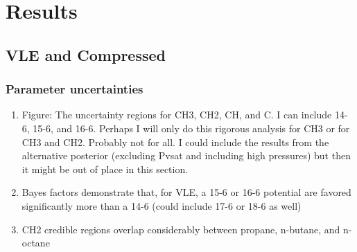 \documentclass[journal=jctc,manuscript=article]{achemso}
\begin{document}
\section{Results} \label{Results}

\subsection{VLE and Compressed}

\subsubsection{Parameter uncertainties}

\begin{enumerate}
	\item Figure: The uncertainty regions for CH3, CH2, CH, and C. I can include 14-6, 15-6, and 16-6. Perhaps I will only do this rigorous analysis for CH3 or for CH3 and CH2. Probably not for all. 
I could include the results from the alternative posterior (excluding Pvsat and including high pressures) but then it might be out of place in this section.
	\item Bayes factors demonstrate that, for VLE, a 15-6 or 16-6 potential are favored significantly more than a 14-6 (could include 17-6 or 18-6 as well)
	\item CH2 credible regions overlap considerably between propane, n-butane, and n-octane

\end{enumerate}
\end{document}
